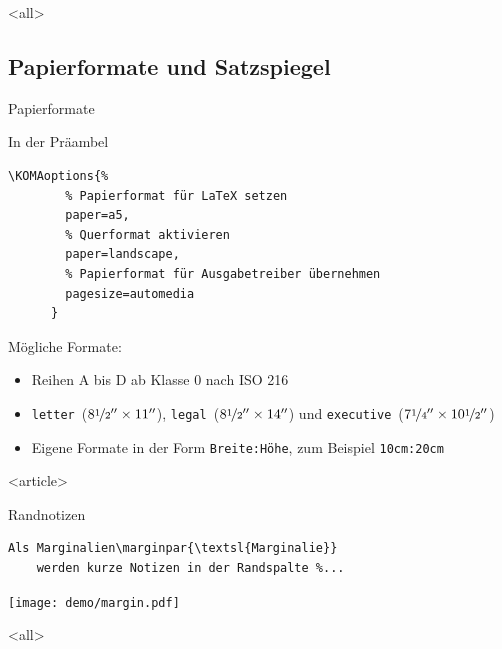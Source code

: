 \mode
<all>

\malte
{}


\subsection{Papierformate und Satzspiegel}

\begin{Frame}[fragile]{Papierformate}
  \begin{Block}{In der Präambel}
    \begin{lstlisting}[gobble=6,style=block]
      \KOMAoptions{%
        % Papierformat für LaTeX setzen
        paper=a5,
        % Querformat aktivieren
        paper=landscape,
        % Papierformat für Ausgabetreiber übernehmen
        pagesize=automedia
      }
    \end{lstlisting}
  \end{Block}

  \xxx

  Mögliche Formate:
  \begin{itemize}
    \item Reihen A bis D ab Klasse 0 nach ISO 216
    \item \lstinline[language={}]-letter-~($8\nicefrac12'' \times 11''$),
      \lstinline-legal-~($8\nicefrac12'' \times 14''$) und
      \lstinline-executive-~($7\nicefrac14'' \times 10\nicefrac12''$)
    \item Eigene Formate in der Form \lstinline-Breite:Höhe-,\newline
      zum Beispiel \lstinline-10cm:20cm-
  \end{itemize}
\end{Frame}

\mode
<article>

\begin{Block}{Randnotizen}
  \begin{lstlisting}[gobble=4]
    Als Marginalien\marginpar{\textsl{Marginalie}}
    werden kurze Notizen in der Randspalte %...
  \end{lstlisting}

  \begin{center}
    \texttt{[image: demo/margin.pdf]}
  \end{center}
\end{Block}

\mode
<all>

